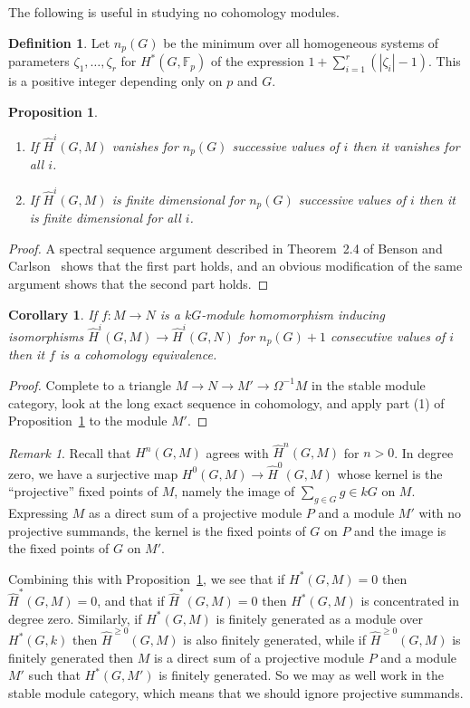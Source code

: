 \documentclass[12pt]{amsart}
\newcommand{\kG}{\kk G}
\newcommand{\kk}{k}
\newcommand{\bF}{\mathbb F}
\renewcommand{\ge}{\geqslant}
\numberwithin{equation}{section}
\theoremstyle{plain}
\newtheorem{proposition}[equation]{Proposition}
\newtheorem{corollary}[equation]{Corollary}
\theoremstyle{definition}
\newtheorem{definition}[equation]{Definition}
\theoremstyle{remark}
\newtheorem{remark}[equation]{Remark}
\begin{document}
The following is useful in studying no cohomology modules.

\begin{definition}
  Let $n_p(G)$ be the minimum over all homogeneous systems of parameters
$\zeta_1,\dots,\zeta_r$ for $H^*(G,\bF_p)$ of the expression
$1+\sum_{i=1}^r(|\zeta_i|-1)$. This is a positive integer depending
only on $p$ and $G$.
\end{definition}
  
\begin{proposition}\label{pr:gaps}\ 
\begin{enumerate} 
\item
If $\hat H^i(G,M)$ vanishes for $n_p(G)$ successive values of $i$ then
it vanishes for all $i$.
\item
If $\hat H^i(G,M)$ is finite dimensional for $n_p(G)$ successive values
of $i$ then it is finite dimensional for all $i$.
\end{enumerate}
\end{proposition}
\begin{proof}
A spectral sequence argument described in Theorem~2.4 of
Benson and Carlson~\cite{Benson/Carlson/Robinson:1990a} shows that the
first part holds, and an obvious 
modification of the same argument shows that the second part holds.
\end{proof}

\begin{corollary}\label{co:gaps}
If $f\colon M\to N$ is a $\kG$-module homomorphism inducing
isomorphisms $\hat H^i(G,M) \to \hat H^i(G,N)$ for $n_p(G)+1$
consecutive values of $i$ then it $f$ is a cohomology equivalence.
\end{corollary}
\begin{proof}
Complete to a triangle $M \to N \to M' \to \Omega^{-1}M$ in the stable
module category, look at the long exact sequence in cohomology, 
and apply part (1) of Proposition~\ref{pr:gaps} to the module $M'$.
\end{proof}

\begin{remark}
Recall that $H^n(G,M)$ agrees with $\hat H^n(G,M)$ for $n>0$. In
degree zero, we have a surjective map $H^0(G,M) \to \hat H^0(G,M)$
whose kernel is the ``projective'' fixed points of $M$, namely the
image of $\sum_{g\in G}g \in \kG$ on $M$. Expressing $M$ as a direct
sum of a projective module $P$ and a module $M'$ with no projective
summands, the kernel is the fixed points of $G$ on $P$ and the image
is the fixed points of $G$ on $M'$.

Combining this with Proposition~\ref{pr:gaps}, we see that if
$H^*(G,M)=0$ then $\hat H^*(G,M)=0$, and that if $\hat H^*(G,M)=0$
then $H^*(G,M)$ is concentrated in degree zero. Similarly, if
$H^*(G,M)$ is finitely generated as a module over $H^*(G,\kk)$
then $\hat H^{\ge 0}(G,M)$ is
also finitely generated, while if $\hat H^{\ge 0}(G,M)$ is finitely
generated then $M$ is a direct sum of a projective module $P$ and a
module $M'$ such that $H^*(G,M')$ is finitely generated.
So we may as well work
in the stable module category, which means that
we should ignore projective summands.
\end{remark}
\end{document}
